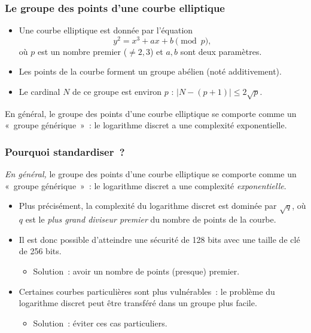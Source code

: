 \documentclass[francais]{beamer}
\newcommand{\abs}[1]{\left| #1 \right|}
\begin{document}
\begin{frame}\frametitle{Le groupe des points d'une courbe elliptique}
\begin{itemize}
\item Une courbe elliptique est donnée par l'équation
\[ y^2 = x^3 + a x + b \pmod{p}, \]
où $p$ est un nombre premier ($\neq 2,3$) et $a, b$ sont deux paramètres.
\item Les points de la courbe forment un groupe abélien
(noté additivement).
\item Le cardinal $N$ de ce groupe est environ $p$ :
$\abs{N-(p+1)} ≤ 2\sqrt{p}$.
\end{itemize}
\begin{block}{}
En général, le groupe des points d'une courbe elliptique
se comporte comme un « groupe générique » :
le logarithme discret a une complexité exponentielle.
\end{block}
\end{frame}

\begin{frame}\frametitle{Pourquoi standardiser ?}
\begin{block}{}
\emph{En général,} le groupe des points d'une courbe elliptique
se comporte comme un « groupe générique » :
le logarithme discret a une complexité \emph{exponentielle}.
\end{block}
\begin{itemize}
\item Plus précisément, la complexité du logarithme discret
est dominée par $\sqrt{q}$, où $q$ est
le \emph{plus grand diviseur premier} du nombre de points de la courbe.
\item Il est donc possible d'atteindre une sécurité de 128 bits
avec une taille de clé de 256 bits.
\begin{itemize}
\item Solution : avoir un nombre de points (presque) premier.
\end{itemize}
\item Certaines courbes particulières sont plus vulnérables :
le problème du logarithme discret peut être transféré
dans un groupe plus facile.
\begin{itemize}
\item Solution : éviter ces cas particuliers.
\end{itemize}
\end{itemize}
\end{frame}
\end{document}
